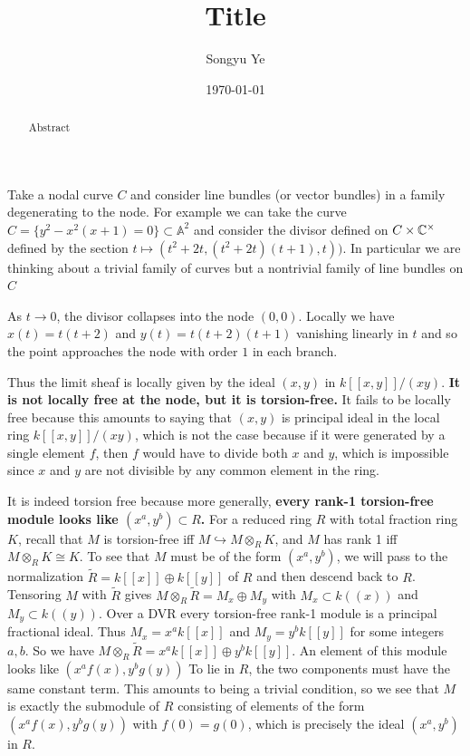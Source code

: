 \documentclass[12pt]{article}
\begin{document}
\rhead{\today}
\cfoot{\thepage}

\title{Title}
\author{Songyu Ye}
\date{\today}
\maketitle

\begin{abstract}
    Abstract
\end{abstract}

\tableofcontents

Take a nodal curve $C$ and consider line bundles (or vector bundles) in a family degenerating to the node. For example we can take the curve $C=\{y^2-x^2(x+1)=0\}\subset \mathbb{A}^2$ and consider the divisor defined on $C\times \mathbb{C}^\times$ defined by the section $t\mapsto(t^2 + 2t,(t^2 + 2t)(t+ 1),t))$. In particular we are thinking about a trivial family of curves but a nontrivial family of line bundles on $C$

As $t\to0$, the divisor collapses into the node $(0,0)$. Locally we have $x(t) = t(t + 2)$ and $y(t) = t(t+2)(t+1)$ vanishing linearly in $t$ and so the point approaches the node with order $1$ in each branch. 

Thus the limit sheaf is locally given by the ideal $(x,y)$ in $k[[x,y]]/(xy)$. \textbf{It is not locally free at the node, but it is torsion-free.} It fails to be locally free because this amounts to saying that $(x,y)$ is principal ideal in the local ring $k[[x,y]]/(xy)$, which is not the case because if it were generated by a single element $f$, then $f$ would have to divide both $x$ and $y$, which is impossible since $x$ and $y$ are not divisible by any common element in the ring.

It is indeed torsion free because more generally, \textbf{every rank-1 torsion-free module looks like
$(x^a,y^b) \subset R$.} For a reduced ring $R$ with total fraction ring $K$, recall that $M$ is torsion-free iff
$M \hookrightarrow M\otimes_R K$, and $M$ has rank 1 iff
$M\otimes_R K \cong K$. To see that $M$ must be of the form $(x^a,y^b)$, we will pass to the normalization $\tilde{R} = k[[x]] \oplus k[[y]]$ of $R$ and then descend back to $R$. Tensoring $M$ with $\tilde{R}$ gives $M\otimes_R \widetilde R
=
M_x \oplus M_y$ with $M_x \subset k((x))$ and $
M_y \subset k((y))$. Over a DVR every torsion-free rank-1 module is a principal fractional ideal. Thus $M_x = x^a k[[x]]$ and $M_y = y^b k[[y]]$ for some integers $a,b$. So we have
$M\otimes_R \tilde{R} = x^a k[[x]] \oplus y^b k[[y]]$. An element of this module looks like $(x^a f(x), y^b g(y))$ To lie in $R$, the two components must have the same constant term. This amounts to being a trivial condition, so we see that $M$ is exactly the submodule of $R$ consisting of elements of the form $(x^a f(x), y^b g(y))$ with $f(0) = g(0)$, which is precisely the ideal $(x^a,y^b)$ in $R$.
\end{document}
